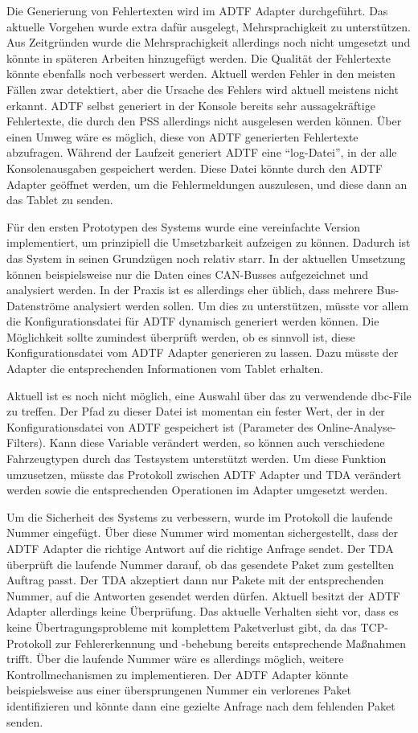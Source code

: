 \documentclass[12pt,a4paper]{report}
\begin{document}
Die Generierung von Fehlertexten wird im ADTF Adapter durchgeführt. Das aktuelle Vorgehen wurde extra dafür ausgelegt, Mehrsprachigkeit zu unterstützen. Aus Zeitgründen wurde die Mehrsprachigkeit allerdings noch nicht umgesetzt und könnte in späteren Arbeiten hinzugefügt werden. Die Qualität der Fehlertexte könnte ebenfalls noch verbessert werden. Aktuell werden Fehler in den meisten Fällen zwar detektiert, aber die Ursache des Fehlers wird aktuell meistens nicht erkannt. ADTF selbst generiert in der Konsole bereits sehr aussagekräftige Fehlertexte, die durch den PSS allerdings nicht ausgelesen werden können. Über einen Umweg wäre es möglich, diese von ADTF generierten Fehlertexte abzufragen. Während der Laufzeit generiert ADTF eine "`log-Datei"', in der alle Konsolenausgaben gespeichert werden. Diese Datei könnte durch den ADTF Adapter geöffnet werden, um die Fehlermeldungen auszulesen, und diese dann an das Tablet zu senden.

Für den ersten Prototypen des Systems wurde eine vereinfachte Version implementiert, um prinzipiell die Umsetzbarkeit aufzeigen zu können. Dadurch ist das System in seinen Grundzügen noch relativ starr. In der aktuellen Umsetzung können beispielsweise nur die Daten eines CAN-Busses aufgezeichnet und analysiert werden. In der Praxis ist es allerdings eher üblich, dass mehrere Bus-Datenströme analysiert werden sollen. Um dies zu unterstützen, müsste vor allem die Konfigurationsdatei für ADTF dynamisch generiert werden können. Die Möglichkeit sollte zumindest überprüft werden, ob es sinnvoll ist, diese Konfigurationsdatei vom ADTF Adapter generieren zu lassen. Dazu müsste der Adapter die entsprechenden Informationen vom Tablet erhalten. 

Aktuell ist es noch nicht möglich, eine Auswahl über das zu verwendende dbc-File zu treffen. Der Pfad zu dieser Datei ist momentan ein fester Wert, der in der Konfigurationsdatei von ADTF gespeichert ist (Parameter des Online-Analyse-Filters). Kann diese Variable verändert werden, so können auch verschiedene Fahrzeugtypen durch das Testsystem unterstützt werden. Um diese Funktion umzusetzen, müsste das Protokoll zwischen ADTF Adapter und TDA verändert werden sowie die entsprechenden Operationen im Adapter umgesetzt werden.

Um die Sicherheit des Systems zu verbessern, wurde im Protokoll die laufende Nummer eingefügt. Über diese Nummer wird momentan sichergestellt, dass der ADTF Adapter die richtige Antwort auf die richtige Anfrage sendet. Der TDA überprüft die laufende Nummer darauf, ob das gesendete Paket zum gestellten Auftrag passt. Der TDA akzeptiert dann nur Pakete mit der entsprechenden Nummer, auf die Antworten gesendet werden dürfen. Aktuell besitzt der ADTF Adapter allerdings keine Überprüfung. Das aktuelle Verhalten sieht vor, dass es keine Übertragungsprobleme mit komplettem Paketverlust gibt, da das TCP-Protokoll zur Fehlererkennung und -behebung bereits entsprechende Ma\ss nahmen trifft. Über die laufende Nummer wäre es allerdings möglich, weitere Kontrollmechanismen zu implementieren. Der ADTF Adapter könnte beispielsweise aus einer übersprungenen Nummer ein verlorenes Paket identifizieren und könnte dann eine gezielte Anfrage nach dem fehlenden Paket senden.
\end{document}
